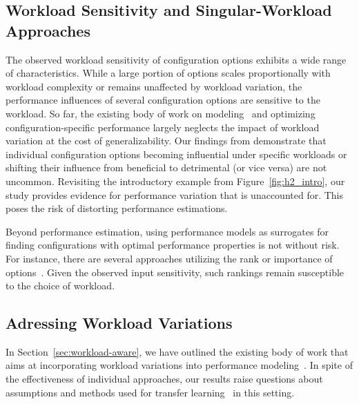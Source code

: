 {{\subsection{Workload Sensitivity and Singular-Workload Approaches}
The observed workload sensitivity of configuration options exhibits a wide range of characteristics. While a large portion of options scales proportionally with workload complexity or remains unaffected by workload variation, the performance influences of several configuration options are sensitive to the workload.  So far, the existing body of work on modeling~\cite{dorn2020,siegmundPerformanceinfluenceModelsHighly2015,haDeepPerf2019,perfAL,guoVariabilityawarePerformancePrediction2013,sarkarCostEfficientSamplingPerformance,guo_2018_data,fourier_learning_2015,perLasso} and optimizing~\cite{chen_mmo_2021,nairUsingBadLearners2017,nairFlash18,ohFindingNearoptimalConfigurations2017} configuration-specific performance largely neglects the impact of workload variation at the cost of generalizability. 
Our findings from  demonstrate that individual configuration options becoming influential under specific workloads or shifting their influence from beneficial to detrimental (or vice versa) are not uncommon. {\color{red}Revisiting the introductory example from Figure~\ref{fig:h2_intro}, our study provides evidence for performance variation that is unaccounted for.} This poses the risk of distorting performance estimations.

Beyond performance estimation, using performance models as surrogates for finding configurations with optimal performance properties is not without risk. For instance, there are several approaches utilizing the rank or importance of options~\cite{nairUsingBadLearners2017,ohFindingNearoptimalConfigurations2017}. Given the observed input sensitivity, such rankings remain susceptible to the choice of workload.



\subsection{Adressing Workload Variations}
In Section~\ref{sec:workload-aware}, we have outlined the existing body of work that aims at incorporating workload variations into performance modeling~\cite{koc_satune_2021,jamishidi_transfer_2017,jamshidi_learning_2018,jamshidi_transfer_gp_2017}. In spite of the effectiveness of individual approaches, our results raise questions about assumptions and methods used for transfer learning~\cite{jamshidi_learning_2018,jamishidi_transfer_2017} in this setting. 

}}

